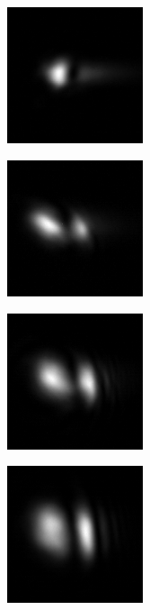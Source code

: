 \begin{figure}[ht]
\centering
\begin{subfigure}[b]{4cm}
\includegraphics[width=4cm,keepaspectratio]{interference/figures/move/123-11.png}
\caption{}
\end{subfigure}
\begin{subfigure}[b]{4cm}
\includegraphics[width=4cm,keepaspectratio]{interference/figures/move/123-10.png}
\caption{}
\end{subfigure}
\begin{subfigure}[b]{4cm}
\includegraphics[width=4cm,keepaspectratio]{interference/figures/move/123-9.png}
\caption{}
\end{subfigure}
\begin{subfigure}[b]{4cm}
\includegraphics[width=4cm,keepaspectratio]{interference/figures/move/123-8.png}
\caption{}
\end{subfigure}

\end{figure}
